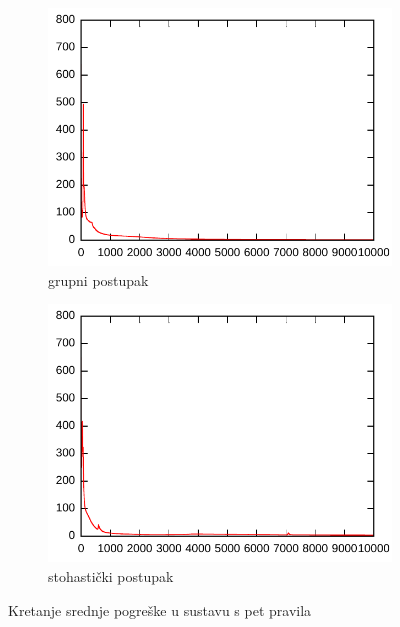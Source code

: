 \documentclass{article}
\begin{document}
\begin{figure}[h]
    \centering
    \begin{subfigure}[b]{0.49\textwidth}
        \centering
        \includegraphics[width=\textwidth]{img/mse-batch-5.pdf}
        \caption{grupni postupak}
    \end{subfigure}
    \hfill
    \begin{subfigure}[b]{0.49\textwidth}
        \centering
        \includegraphics[width=\textwidth]{img/mse-stochastic-5.pdf}
        \caption{stohastički postupak}
    \end{subfigure}
    \hfill
    \caption{Kretanje srednje pogreške u sustavu s pet pravila}
    \label{mse-5}
\end{figure}
\end{document}
